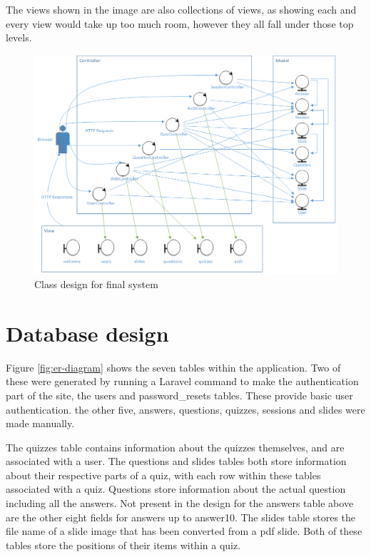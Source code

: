 The views shown in the image are also collections of views, as showing each and every view would take up too much room, however they all fall under those top levels.

\begin{figure}
	\caption{Class design for final system}
	\centerline{\includegraphics{Chapter3/overall-class-design}}
	\label{fig:overall-class-design}
\end{figure}

\newpage
\section{Database design}
Figure \ref{fig:er-diagram} shows the seven tables within the application. Two of these were generated by running a Laravel command to make the authentication part of the site, the users and password\_resets tables. These provide basic user authentication. the other five, answers, questions, quizzes, sessions and slides were made manually.

The quizzes table contains information about the quizzes themselves, and are associated with a user. The questions and slides tables both store information about their respective parts of a quiz, with each row within these tables associated with a quiz. Questions store information about the actual question including all the answers. Not present in the design  for the answers table above are the other eight fields for answers up to answer10. The slides table stores the file name of a slide image that has been converted from a pdf slide. Both of these tables store the positions of their items within a quiz.


